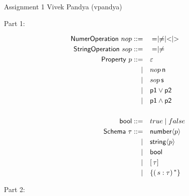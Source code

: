 \documentclass[11pt]{article}
\newcommand{\prop}[1]{\langle{#1}\rangle}%
\begin{document}
\hwtitle
  {Assignment 1}
  {Vivek Pandya (vpandya)} %


Part 1:

\begin{alignat*}{1}
\msf{NumerOperation}~nop ::= \qamp = \mid \ne \mid < \mid > \\
\msf{StringOperation}~sop ::= \qamp = \mid \ne \\ 
\msf{Property}~p ::= \qamp \varepsilon \\
\mid \qamp nop \, \msf{n} \\
\mid \qamp sop \, \msf{s} \\
\mid \qamp \msf{p1} \vee \msf{p2} \\
\mid \qamp \msf{p1} \wedge \msf{p2} \\
\\
\msf{bool} ::= \qamp true \mid false \\
\msf{Schema}~\tau ::= \qamp \tnum \prop{p} \\
\mid \qamp \tstr \prop{p}\\
\mid \qamp \msf{bool} \\
\mid \qamp [\, \tau ]\, \\
\mid \qamp \{ (\, s : \tau)\, ^{*}\} \\
\end{alignat*}

Part 2:
\end{document}
